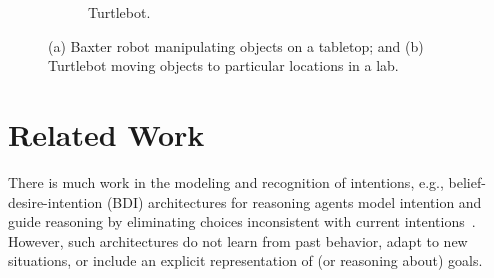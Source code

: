\documentclass[letterpaper, 10 pt, conference]{article}  %
\begin{document}
\begin{figure}[tb]
\begin{center}
\begin{subfigure}{0.17\textwidth}
      \caption{Turtlebot.}
      \label{fig:example-turtlebot}
    \end{subfigure}
  \end{center}
  \vspace{-1em}
  \caption{(a) Baxter robot manipulating objects on a tabletop; and
    (b) Turtlebot moving objects to particular locations in a lab.}
  \label{fig:example-robots}
  \vspace{-1em}
\end{figure}




\section{Related Work}
\label{sec:relwork}
There is much work in the modeling and recognition of intentions,
e.g., belief-desire-intention (BDI) architectures for reasoning agents
model intention and guide reasoning by eliminating choices
inconsistent with current intentions~\cite{bratman1987intention}.
However, such architectures do not learn from past behavior, adapt to
new situations, or include an explicit representation of (or reasoning
about) goals.
 
\end{document}

